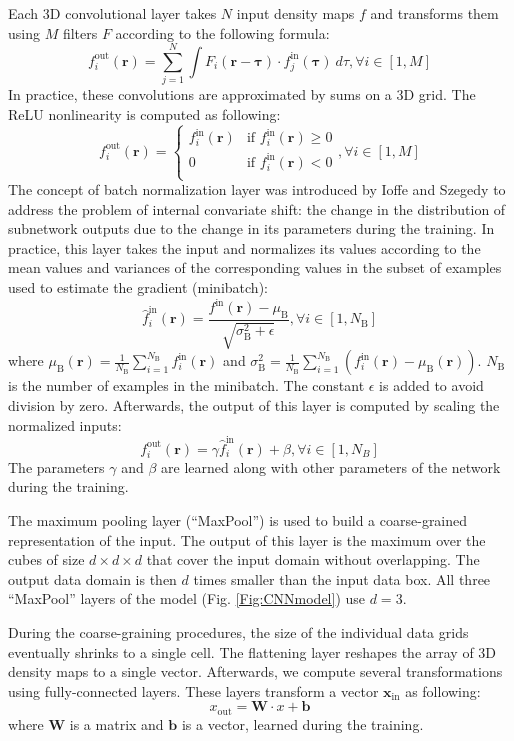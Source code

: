 Each 3D convolutional layer takes $N$ input density maps $f$ and
transforms them using $M$ filters $F$ according to the following
formula:
$$
f^\text{out}_i (\mathbf{r}) = \sum^{N}_{j=1} \int F_i (\mathbf{r} - \mathbf{\tau}) \cdot f^\text{in}_j(\mathbf{\tau}) ~d\tau, \forall i \in [1,M]
$$
In practice, these convolutions are approximated by sums on a 3D grid.
The ReLU nonlinearity is computed as following:
$$
f^\text{out}_i (\mathbf{r}) = \begin{cases}
               f^\text{in}_i(\mathbf{r}) &\text{if } f^\text{in}_i(\mathbf{r})\geq 0\\
               0                         &\text{if } f^\text{in}_i(\mathbf{r})<0\\
            \end{cases}, \forall i \in [1,M]
$$
The concept of batch normalization layer was introduced by Ioffe and
Szegedy \cite{ioffe2015batch} to address the problem of internal
convariate shift: the change in the distribution of subnetwork outputs
due to the change in its parameters during the training. In practice,
this layer takes the input and normalizes its values according to the
mean values and variances of the corresponding values in the subset of
examples used to estimate the gradient (minibatch):
$$
\hat{f}^\text{in}_i(\mathbf{r}) = \frac{f^\text{in}(\mathbf{r}) - \mu_\text{B}}{\sqrt{\sigma^{2}_\text{B} + \epsilon}}, \forall i \in [1,N_\text{B}]
$$
where $\mu_\text{B}(\mathbf{r})
= \frac{1}{N_\text{B}} \sum_{i=1}^{N_\text{B}}
f^\text{in}_i(\mathbf{r})$ and $\sigma^{2}_\text{B}
= \frac{1}{N_\text{B}} \sum_{i=1}^{N_\text{B}} \left(
f^\text{in}_i(\mathbf{r}) - \mu_\text{B}
(\mathbf{r}) \right)$. $N_\text{B}$ is the number of examples in the
minibatch. The constant $\epsilon$ is added to avoid division by
zero. Afterwards, the output of this layer is computed by scaling the
normalized inputs:
$$
f^\text{out}_i(\mathbf{r}) = \gamma \hat{f}^\text{in}_i(\mathbf{r}) + \beta, \forall i \in [1,N_B]
$$
The parameters $\gamma$ and $\beta$ are learned along with other
parameters of the network during the training.

The maximum pooling layer (``MaxPool'') is used to build a
coarse-grained representation of the input. The output of this layer
is the maximum over the cubes of size $d \times d \times d$ that cover
the input domain without overlapping.  The output data domain is then
$d$ times smaller than the input data box. All three ``MaxPool''
layers of the model (Fig. \ref{Fig:CNNmodel}) use $d=3$.

During the coarse-graining procedures, the size of the individual data
grids eventually shrinks to a single cell. The flattening layer
reshapes the array of 3D density maps to a single vector. Afterwards,
we compute several transformations using fully-connected layers. These
layers transform a vector $\mathbf{x}_\text{in}$ as following:
$$
x_\text{out} = \mathbf{W} \cdot x + \mathbf{b}
$$
where $\mathbf{W}$ is a matrix and $\mathbf{b}$ is a vector, learned
during the training.
